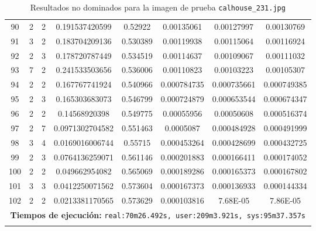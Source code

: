 \begin{longtable}{|c|c|c|c|c|c|c|c|}
90 & 2 & 2 & 0.191537420599 & 0.52922 & 0.00135061 & 0.00127997 & 0.00130769 \\
91 & 3 & 2 & 0.183704209136 & 0.530389 & 0.00119938 & 0.00115064 & 0.00116924 \\
92 & 2 & 3 & 0.178720787449 & 0.534519 & 0.00114637 & 0.00109067 & 0.00111032 \\
93 & 7 & 2 & 0.241533503656 & 0.536006 & 0.00110823 & 0.00103223 & 0.00105307 \\
94 & 2 & 2 & 0.167767741924 & 0.540966 & 0.000784735 & 0.000735661 & 0.000749385 \\
95 & 2 & 3 & 0.165303683073 & 0.546799 & 0.000724879 & 0.000653544 & 0.000674347 \\
96 & 2 & 2 & 0.14568920398 & 0.549775 & 0.00055956 & 0.00050608 & 0.000516374 \\
97 & 2 & 7 & 0.0971302704582 & 0.551463 & 0.0005087 & 0.000484928 & 0.000491999 \\
98 & 3 & 4 & 0.0169016006744 & 0.55715 & 0.000453264 & 0.000428699 & 0.000432725 \\
99 & 2 & 3 & 0.0764136259071 & 0.561146 & 0.000201883 & 0.000166411 & 0.000174052 \\
100 & 2 & 2 & 0.049662954082 & 0.565069 & 0.000189286 & 0.000165373 & 0.000167802 \\
101 & 3 & 3 & 0.0412250071562 & 0.573604 & 0.000167373 & 0.000136933 & 0.000144334 \\
102 & 2 & 2 & 0.0213381170565 & 0.573629 & 0.000103816 & 7.68E-05 & 7.86E-05 \\
\hline
\multicolumn{8}{|c|}{\textbf{Tiempos de ejecución:} \texttt{real:70m26.492s, user:209m3.921s, sys:95m37.357s}}\\  \hline
\caption{Resultados no dominados para la imagen de prueba \texttt{calhouse\_231.jpg}}
\label{tab:calhouse_231}
\end{longtable}
\normalsize

